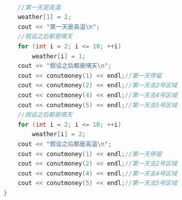 \documentclass[withoutpreface,bwprint]{cumcmthesis} %
\begin{document}
\begin{appendices}
\begin{lstlisting}[language=c++]
    
    //第一天是高温
    weather[1] = 2;
    cout << "第一天是高温\n";
    //假设之后都是晴天
    for (int i = 2; i <= 10; ++i)
        weather[i] = 1;
    cout << "假设之后都是晴天\n";
    cout << conutmoney(1) << endl;//第一天停留
    cout << conutmoney(2) << endl;//第一天去2号区域
    cout << conutmoney(4) << endl;//第一天去4号区域
    cout << conutmoney(5) << endl;//第一天去5号区域
    //假设之后都是晴天
    for (int i = 2; i <= 10; ++i)
        weather[i] = 2;
    cout << "假设之后都是高温\n";
    cout << conutmoney(1) << endl;//第一天停留
    cout << conutmoney(2) << endl;//第一天去2号区域
    cout << conutmoney(4) << endl;//第一天去4号区域
    cout << conutmoney(5) << endl;//第一天去5号区域
}
\end{lstlisting}

\end{appendices}
\end{document}
